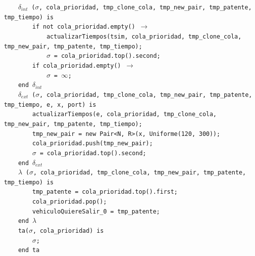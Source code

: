 \documentclass[12pt]{article}
\begin{document}
\begin{tcolorbox}[
    colback=black!5!white,
    colframe=black!80!white,
    boxrule=0.8pt,
    arc=2pt,
    left=5pt,
    right=5pt,
    top=5pt,
    bottom=5pt,
    fontupper=\ttfamily,
    breakable
]
\begin{flushleft}
\begin{flushleft}
\texttt{~~~~$\delta_{int}$ ($\sigma$, cola\_prioridad, tmp\_clone\_cola, tmp\_new\_pair, tmp\_patente, tmp\_tiempo) is}\\
\texttt{~~~~~~~~if not cola\_prioridad.empty() }\(\rightarrow\)\\
\texttt{~~~~~~~~~~~~actualizarTiempos(tsim, cola\_prioridad, tmp\_clone\_cola, tmp\_new\_pair, tmp\_patente, tmp\_tiempo);}\\
\texttt{~~~~~~~~~~~~$\sigma$ = cola\_prioridad.top().second;}\\
\texttt{~~~~~~~~if cola\_prioridad.empty() }\(\rightarrow\)\\
\texttt{~~~~~~~~~~~~$\sigma$ = $\infty$;}\\
\texttt{~~~~end $\delta_{int}$}\\[5pt]

\texttt{~~~~$\delta_{ext}$ ($\sigma$, cola\_prioridad, tmp\_clone\_cola, tmp\_new\_pair, tmp\_patente, tmp\_tiempo, e, x, port) is}\\
\texttt{~~~~~~~~actualizarTiempos(e, cola\_prioridad, tmp\_clone\_cola, tmp\_new\_pair, tmp\_patente, tmp\_tiempo);}\\
\texttt{~~~~~~~~tmp\_new\_pair = new Pair<N, R>(x, Uniforme(120, 300));}\\
\texttt{~~~~~~~~cola\_prioridad.push(tmp\_new\_pair);}\\
\texttt{~~~~~~~~$\sigma$ = cola\_prioridad.top().second;}\\
\texttt{~~~~end $\delta_{ext}$}\\[5pt]

\texttt{~~~~$\lambda$ ($\sigma$, cola\_prioridad, tmp\_clone\_cola, tmp\_new\_pair, tmp\_patente, tmp\_tiempo) is}\\
\texttt{~~~~~~~~tmp\_patente = cola\_prioridad.top().first;}\\
\texttt{~~~~~~~~cola\_prioridad.pop();}\\
\texttt{~~~~~~~~vehiculoQuiereSalir\_0 = tmp\_patente;}\\
\texttt{~~~~end $\lambda$}\\[5pt]

\texttt{~~~~ta($\sigma$, cola\_prioridad) is}\\
\texttt{~~~~~~~~$\sigma$;}\\
\texttt{~~~~end ta}\\[5pt]


\end{flushleft}
\end{flushleft}
\end{tcolorbox}
\end{document}
